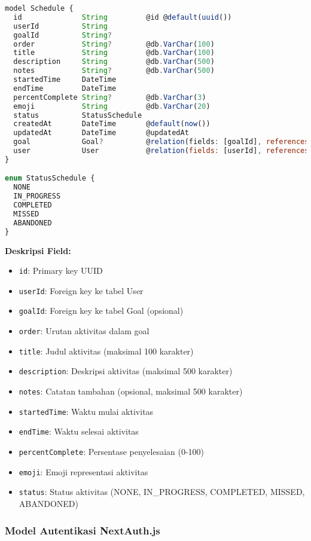 \begin{lstlisting}[language=JavaScript, caption=Skema Model Schedule]
model Schedule {
  id              String         @id @default(uuid())
  userId          String
  goalId          String?
  order           String?        @db.VarChar(100)
  title           String         @db.VarChar(100)
  description     String         @db.VarChar(500)
  notes           String?        @db.VarChar(500)
  startedTime     DateTime
  endTime         DateTime
  percentComplete String?        @db.VarChar(3)
  emoji           String         @db.VarChar(20)
  status          StatusSchedule
  createdAt       DateTime       @default(now())
  updatedAt       DateTime       @updatedAt
  goal            Goal?          @relation(fields: [goalId], references: [id])
  user            User           @relation(fields: [userId], references: [id])
}

enum StatusSchedule {
  NONE
  IN_PROGRESS
  COMPLETED
  MISSED
  ABANDONED
}
\end{lstlisting}

\textbf{Deskripsi Field:}
\begin{itemize}
\item \texttt{id}: Primary key UUID
\item \texttt{userId}: Foreign key ke tabel User
\item \texttt{goalId}: Foreign key ke tabel Goal (opsional)
\item \texttt{order}: Urutan aktivitas dalam goal
\item \texttt{title}: Judul aktivitas (maksimal 100 karakter)
\item \texttt{description}: Deskripsi aktivitas (maksimal 500 karakter)
\item \texttt{notes}: Catatan tambahan (opsional, maksimal 500 karakter)
\item \texttt{startedTime}: Waktu mulai aktivitas
\item \texttt{endTime}: Waktu selesai aktivitas
\item \texttt{percentComplete}: Persentase penyelesaian (0-100)
\item \texttt{emoji}: Emoji representasi aktivitas
\item \texttt{status}: Status aktivitas (NONE, IN\_PROGRESS, COMPLETED, MISSED, ABANDONED)
\end{itemize}

\subsubsection{Model Autentikasi NextAuth.js}

